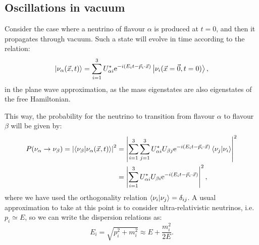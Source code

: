 \subsection{Oscillations in vacuum}

Consider the case where a neutrino of flavour $\alpha$ is produced at $t=0$, and then it propagates through vacuum. Such a state will evolve in time according to the relation:
\begin{equation}
\ket{\nu_{\alpha}(\vec{x}, t)} = \sum_{i=1}^{3} U^{*}_{\alpha i} \mathrm{e}^{-i(E_{i}t-\vec{p}_{i}\cdot\vec{x})} \ket{\nu_{i}(\vec{x}=\vec{0},t=0)},
\end{equation}
in the plane wave approximation, as the mass eigenstates are also eigenstates of the free Hamiltonian.

This way, the probability for the neutrino to transition from flavour $\alpha$ to flavour $\beta$ will be given by:
\begin{equation}
\begin{split}
	P(\nu_{\alpha} \rightarrow \nu_{\beta}) = \left|\braket{\nu_{\beta}}{\nu_{\alpha}(\vec{x}, t)}\right|^{2} &= \left|\sum_{i=1}^{3} \sum_{j=1}^{3} U^{*}_{\alpha i} U_{\beta j} \mathrm{e}^{-i(E_{i}t-\vec{p}_{i}\cdot\vec{x})} \braket{\nu_{j}}{\nu_{i}}\right|^{2}\\
	&= \left|\sum_{i=1}^{3} U^{*}_{\alpha i} U_{\beta i} \mathrm{e}^{-i(E_{i}t-\vec{p}_{i}\cdot\vec{x})}\right|^{2},
\end{split}
\end{equation}
where we have used the orthogonality relation $\braket{\nu_{i}}{\nu_{j}} = \delta_{ij}$. A usual approximation to take at this point is to consider ultra-relativistic neutrinos, i.e. $p_{i} \simeq E$, so we can write the dispersion relations as:
\begin{equation}
E_{i} = \sqrt{p_{i}^{2} + m_{i}^{2}} \approx E + \frac{m_{i}^{2}}{2 E}.
\end{equation}

